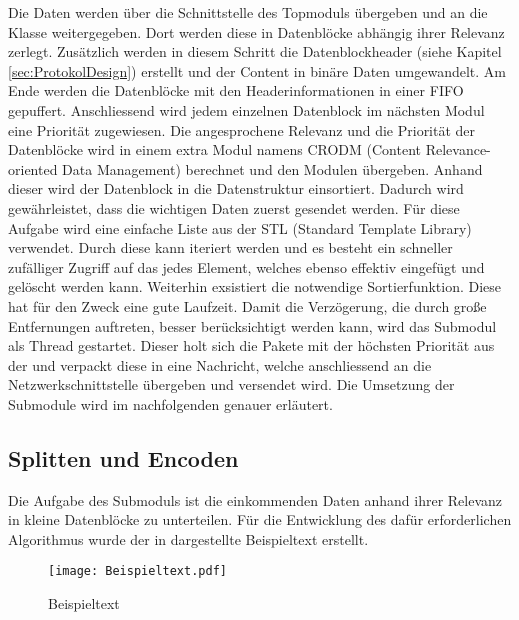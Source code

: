 Die Daten werden {\"u}ber die Schnittstelle des Topmoduls {\"u}bergeben und an die
Klasse  weitergegeben. Dort werden diese in Datenbl{\"o}cke
abh{\"a}ngig ihrer Relevanz zerlegt. Zus{\"a}tzlich werden in diesem Schritt die
Datenblockheader (siehe Kapitel \ref{sec:ProtokolDesign}) erstellt und der
Content in bin{\"a}re Daten umgewandelt. Am Ende werden die Datenbl{\"o}cke mit den
Headerinformationen in einer \gls{FIFO} gepuffert.
Anschliessend wird jedem einzelnen Datenblock im n{\"a}chsten Modul eine Priorit{\"a}t zugewiesen. Die angesprochene
Relevanz und die Priorit{\"a}t der Datenbl{\"o}cke wird in einem extra Modul namens
\gls{CRODM} (Content Relevance-oriented Data Management)
berechnet und den Modulen {\"u}bergeben.
Anhand dieser wird der Datenblock in die Datenstruktur
 einsortiert. Dadurch wird
gew{\"a}hrleistet, dass die wichtigen Daten zuerst gesendet werden. F{\"u}r diese
Aufgabe wird eine einfache Liste aus der \gls{STL} (Standard Template Library)
verwendet. Durch diese kann iteriert werden und es besteht ein schneller zufälliger Zugriff auf das jedes Element, welches ebenso effektiv eingefügt und
gelöscht werden kann. Weiterhin exsistiert die notwendige Sortierfunktion. Diese
hat f{\"u}r den Zweck eine gute Laufzeit.
Damit die Verz{\"o}gerung, die durch gro{\ss}e Entfernungen auftreten, besser
ber{\"u}cksichtigt werden kann, wird das Submodul  als Thread
gestartet.
Dieser holt sich die Pakete mit der h{\"o}chsten Priorit{\"a}t aus der
 und verpackt diese in eine Nachricht, welche
anschliessend an die Netzwerkschnittstelle {\"u}bergeben und versendet wird. \newline
Die Umsetzung der Submodule wird im nachfolgenden genauer erl{\"a}utert.

\subsection{Splitten und Encoden}

Die Aufgabe des Submoduls  ist die einkommenden Daten
anhand ihrer Relevanz in kleine Datenbl{\"o}cke zu unterteilen. F{\"u}r die Entwicklung
des daf{\"u}r erforderlichen Algorithmus wurde der in 
dargestellte Beispieltext erstellt.

\begin{figure}[H]
\centering
\texttt{[image: Beispieltext.pdf]}
\caption{Beispieltext}
\label{fig:Beispieltext}
\end{figure}

